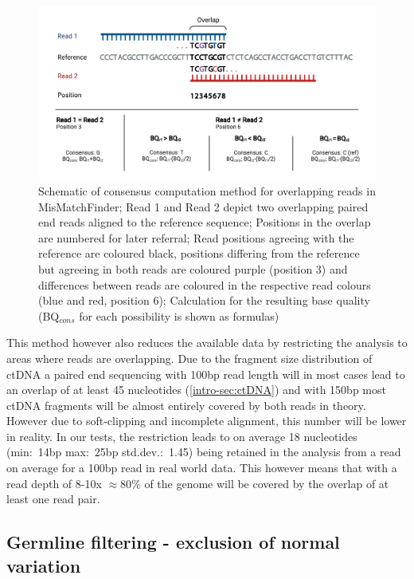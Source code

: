 \begin{figure}[!ht]
\centering
\includegraphics[width=.99\linewidth]{Figures/MisMatchFinder/ConsensusMethodMisMatchFinder.pdf}
\caption[Schematic of consensus computation method for overlapping reads]{Schematic of consensus computation method for overlapping reads in MisMatchFinder; Read 1 and Read 2 depict two overlapping paired end reads aligned to the reference sequence; Positions in the overlap are numbered for later referral; Read positions agreeing with the reference are coloured black, positions differing from the reference but agreeing in both reads are coloured purple (position 3) and differences between reads are coloured in the respective read colours (blue and red, position 6); Calculation for the resulting base quality (BQ$_{cons}$ for each possibility is shown as formulas)}\label{fig:mmf-consensus}
\end{figure}

This method however also reduces the available data by restricting the analysis to areas where reads are overlapping. Due to the fragment size distribution of ctDNA a paired end sequencing with 100bp  read length will in most cases lead to an overlap of at least 45 nucleotides (\autoref{intro-sec:ctDNA}) and with 150bp most ctDNA fragments will be almost entirely covered by both reads in theory. However due to soft-clipping and incomplete alignment, this number will be lower in reality.
In our tests, the restriction leads to on average 18 nucleotides (min:~14bp max:~25bp std.dev.:~1.45) being retained in the analysis from a read on average for a 100bp read in real world data. This however means that with a read depth of 8-10x $\approx$80\% of the genome will be covered by the overlap of at least one read pair.



\subsection[Germline filtering]{Germline filtering - exclusion of normal variation}
\label{mmf-sec:germline}

